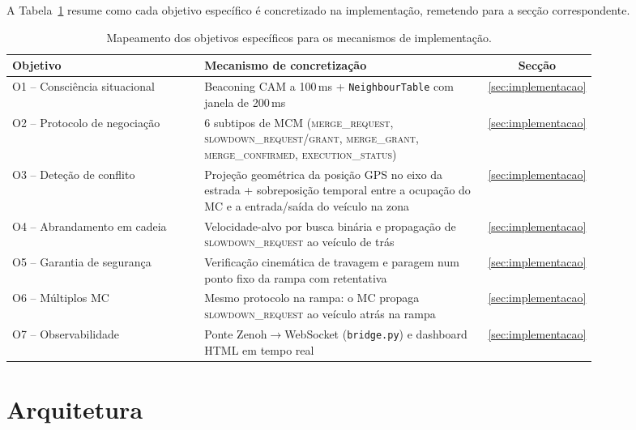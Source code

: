 \documentclass[11pt,a4paper]{article}
\begin{document}
A Tabela~\ref{tab:objetivos} resume como cada objetivo específico é concretizado na
implementação, remetendo para a secção correspondente.

\begin{table}[H]
  \centering
  \small
  \renewcommand{\arraystretch}{1.25}
  \begin{tabular}{@{}p{0.34\linewidth}p{0.50\linewidth}c@{}}
    \toprule
    \textbf{Objetivo} & \textbf{Mecanismo de concretização} & \textbf{Secção} \\
    \midrule
    O1 -- Consciência situacional &
      Beaconing CAM a 100\,ms + \texttt{NeighbourTable} com janela de 200\,ms &
      \ref{sec:implementacao} \\
    O2 -- Protocolo de negociação &
      6 subtipos de MCM (\textsc{merge\_request}, \textsc{slowdown\_request/grant},
      \textsc{merge\_grant}, \textsc{merge\_confirmed}, \textsc{execution\_status}) &
      \ref{sec:implementacao} \\
    O3 -- Deteção de conflito &
      Projeção geométrica da posição GPS no eixo da estrada + sobreposição temporal entre
      a ocupação do MC e a entrada/saída do veículo na zona &
      \ref{sec:implementacao} \\
    O4 -- Abrandamento em cadeia &
      Velocidade-alvo por busca binária e propagação de
      \textsc{slowdown\_request} ao veículo de trás &
      \ref{sec:implementacao} \\
    O5 -- Garantia de segurança &
      Verificação cinemática de travagem e paragem num ponto fixo da rampa com retentativa &
      \ref{sec:implementacao} \\
    O6 -- Múltiplos MC &
      Mesmo protocolo na rampa: o MC propaga \textsc{slowdown\_request} ao veículo atrás
      na rampa &
      \ref{sec:implementacao} \\
    O7 -- Observabilidade &
      Ponte Zenoh$\rightarrow$WebSocket (\texttt{bridge.py}) e dashboard HTML em tempo real &
      \ref{sec:implementacao} \\
    \bottomrule
  \end{tabular}
  \caption{Mapeamento dos objetivos específicos para os mecanismos de implementação.}
  \label{tab:objetivos}
\end{table}

\section{Arquitetura}
\label{sec:arquitetura}
\end{document}
